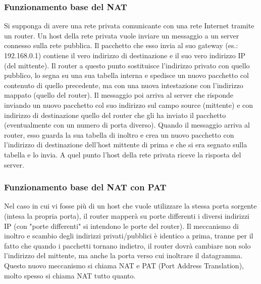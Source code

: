 \subsubsection{Funzionamento base del NAT}
\begin{example}
  Si supponga di avere una rete privata comunicante con una rete Internet tramite un router. Un host della rete privata vuole inviare un messaggio a un server connesso sulla rete pubblica. Il pacchetto che esso invia al suo gateway (es.: 192.168.0.1) contiene il vero indirizzo di destinazione e il suo vero indirizzo IP (del mittente). Il router a questo punto sostituisce l’indirizzo privato con quello pubblico, lo segna su una sua tabella interna e spedisce un nuovo pacchetto col contenuto di quello precedente, ma con una nuova intestazione con l’indirizzo mappato (quello del router). Il messaggio poi arriva al server che risponde inviando un nuovo pacchetto col suo indirizzo sul campo source (mittente) e con indirizzo di destinazione quello del router che gli ha inviato il pacchetto (eventualmente con un numero di porta diverso). Quando il messaggio arriva al router, esso guarda la sua tabella di inoltro e crea un nuovo pacchetto con l’indirizzo di destinazione dell’host mittente di prima e che si era segnato sulla tabella e lo invia. A quel punto l’host della rete privata riceve la risposta del server.
\end{example}
\subsubsection{Funzionamento base del NAT con PAT}
\begin{example}
  Nel caso in cui vi fosse più di un host che vuole utilizzare la stessa porta sorgente (intesa la propria porta), il router mapperà su porte differenti i diversi indirizzi IP (con "porte differenti" si intendono le porte del router). Il meccanismo di inoltro e scambio degli indirizzi privati/pubblici è identico a prima, tranne per il fatto che quando i pacchetti tornano indietro, il router dovrà cambiare non solo l’indirizzo del mittente, ma anche la porta verso cui inoltrare il datagramma. Questo nuovo meccanismo si chiama NAT e PAT (Port Address Translation), molto spesso si chiama NAT tutto quanto.
\end{example}
